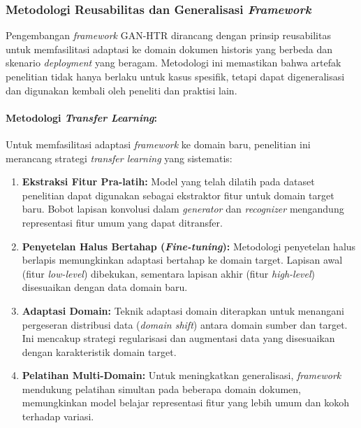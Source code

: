 \documentclass[12pt,a4paper]{article}
\begin{document}
\subsubsection{Metodologi Reusabilitas dan Generalisasi \textit{Framework}}
Pengembangan \textit{framework} GAN-HTR dirancang dengan prinsip reusabilitas untuk memfasilitasi adaptasi ke domain dokumen historis yang berbeda dan skenario \textit{deployment} yang beragam. Metodologi ini memastikan bahwa artefak penelitian tidak hanya berlaku untuk kasus spesifik, tetapi dapat digeneralisasi dan digunakan kembali oleh peneliti dan praktisi lain.

\paragraph{Metodologi \textit{Transfer Learning}:}
Untuk memfasilitasi adaptasi \textit{framework} ke domain baru, penelitian ini merancang strategi \textit{transfer learning} yang sistematis:

\begin{enumerate}[label=\arabic*., leftmargin=*, nosep]
\item \textbf{Ekstraksi Fitur Pra-latih:} Model yang telah dilatih pada dataset penelitian dapat digunakan sebagai ekstraktor fitur untuk domain target baru. Bobot lapisan konvolusi dalam \textit{generator} dan \textit{recognizer} mengandung representasi fitur umum yang dapat ditransfer.

\item \textbf{Penyetelan Halus Bertahap (\textit{Fine-tuning}):} Metodologi penyetelan halus berlapis memungkinkan adaptasi bertahap ke domain target. Lapisan awal (fitur \textit{low-level}) dibekukan, sementara lapisan akhir (fitur \textit{high-level}) disesuaikan dengan data domain baru.

\item \textbf{Adaptasi Domain:} Teknik adaptasi domain diterapkan untuk menangani pergeseran distribusi data (\textit{domain shift}) antara domain sumber dan target. Ini mencakup strategi regularisasi dan augmentasi data yang disesuaikan dengan karakteristik domain target.

\item \textbf{Pelatihan Multi-Domain:} Untuk meningkatkan generalisasi, \textit{framework} mendukung pelatihan simultan pada beberapa domain dokumen, memungkinkan model belajar representasi fitur yang lebih umum dan kokoh terhadap variasi.
\end{enumerate}
\end{document}
